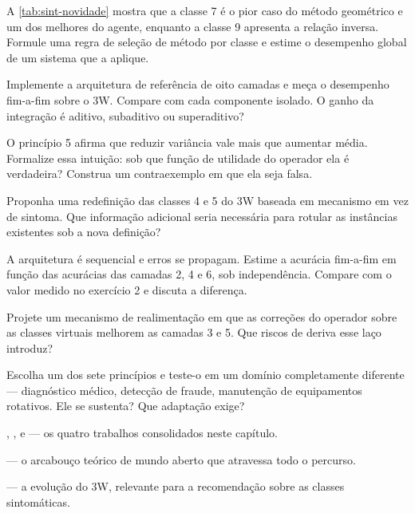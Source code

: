 \begin{exercicios}
\item A \cref{tab:sint-novidade} mostra que a classe 7 é o pior caso do método geométrico
      e um dos melhores do agente, enquanto a classe 9 apresenta a relação inversa.
      Formule uma regra de seleção de método por classe e estime o desempenho global de
      um sistema que a aplique.

\item Implemente a arquitetura de referência de oito camadas e meça o desempenho
      fim-a-fim sobre o 3W. Compare com cada componente isolado. O ganho da integração é
      aditivo, subaditivo ou superaditivo?

\item O princípio 5 afirma que reduzir variância vale mais que aumentar média. Formalize
      essa intuição: sob que função de utilidade do operador ela é verdadeira? Construa um
      contraexemplo em que ela seja falsa.

\item Proponha uma redefinição das classes 4 e 5 do 3W baseada em mecanismo em vez de
      sintoma. Que informação adicional seria necessária para rotular as instâncias
      existentes sob a nova definição?

\item A arquitetura é sequencial e erros se propagam. Estime a acurácia fim-a-fim em
      função das acurácias das camadas 2, 4 e 6, sob independência. Compare com o valor
      medido no exercício 2 e discuta a diferença.

\item Projete um mecanismo de realimentação em que as correções do operador sobre as
      classes virtuais melhorem as camadas 3 e 5. Que riscos de deriva esse laço
      introduz?

\item Escolha um dos sete princípios e teste-o em um domínio completamente diferente ---
      diagnóstico médico, detecção de fraude, manutenção de equipamentos rotativos.
      Ele se sustenta? Que adaptação exige?
\end{exercicios}

\begin{leituras}
\item \citet{LopesTese2025}, \citet{Lopes2026PST}, \citet{Lopes2026OTC} e
      \citet{Lopes2026LLM} --- os quatro trabalhos consolidados neste capítulo.
\item \citet{Scheirer2013} --- o arcabouço teórico de mundo aberto que atravessa todo o
      percurso.
\item \citet{VazVargas2026_3w2} --- a evolução do 3W, relevante para a recomendação sobre as
      classes sintomáticas.
\end{leituras}
